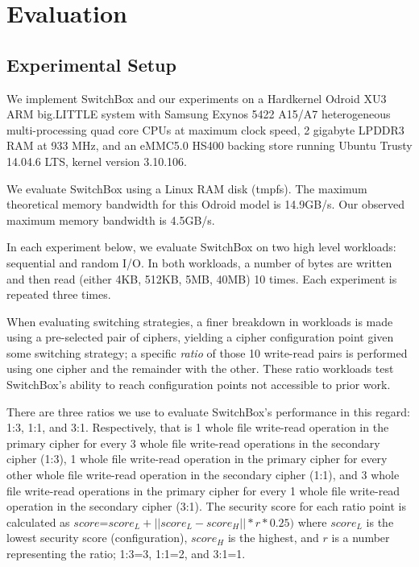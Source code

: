 \section{Evaluation}\label{sec:evaluation}

\subsection{Experimental Setup}

We implement SwitchBox and our experiments on a Hardkernel Odroid XU3 ARM
big.LITTLE system with Samsung Exynos 5422 A15/A7 heterogeneous multi-processing
quad core CPUs at maximum clock speed, 2 gigabyte LPDDR3 RAM at 933 MHz, and an
eMMC5.0 HS400 backing store running Ubuntu Trusty 14.04.6 LTS, kernel version
3.10.106.

We evaluate SwitchBox using a Linux RAM disk (tmpfs). The maximum theoretical
memory bandwidth for this Odroid model is 14.9GB/s\@. Our observed maximum
memory bandwidth is 4.5GB/s. 

In each experiment below, we evaluate SwitchBox on two high level workloads:
sequential and random I/O. In both workloads, a number of bytes are written and
then read (either 4KB, 512KB, 5MB, 40MB) 10 times. Each experiment is repeated
three times.

When evaluating switching strategies, a finer breakdown in workloads is made
using a pre-selected pair of ciphers, yielding a cipher configuration point
given some switching strategy; a specific \emph{ratio} of those 10 write-read
pairs is performed using one cipher and the remainder with the other. These
ratio workloads test SwitchBox's ability to reach configuration points not
accessible to prior work.

There are three ratios we use to evaluate SwitchBox's performance in this
regard: 1:3, 1:1, and 3:1. Respectively, that is 1 whole file write-read
operation in the primary cipher for every 3 whole file write-read operations in
the secondary cipher (1:3), 1 whole file write-read operation in the primary
cipher for every other whole file write-read operation in the secondary cipher
(1:1), and 3 whole file write-read operations in the primary cipher for every 1
whole file write-read operation in the secondary cipher (3:1). The security
score for each ratio point is calculated as $score$=$score_L + ||score_L -
score_H|| * r * 0.25)$ where $score_L$ is the lowest security score
(configuration), $score_H$ is the highest, and $r$ is a number representing the
ratio; 1:3=3, 1:1=2, and 3:1=1.

